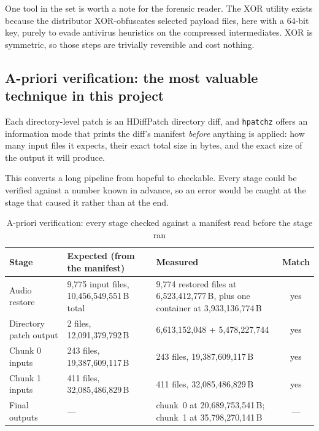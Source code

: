 One tool in the set is worth a note for the forensic reader. The XOR utility
exists because the distributor XOR-obfuscates selected payload files, here with a
64-bit key, purely to evade antivirus heuristics on the compressed intermediates.
XOR is symmetric, so those steps are trivially reversible and cost nothing.

\subsection{A-priori verification: the most valuable technique in this project}

Each directory-level patch is an HDiffPatch directory diff, and \verb|hpatchz|
offers an information mode that prints the diff's manifest \emph{before} anything
is applied: how many input files it expects, their exact total size in bytes, and
the exact size of the output it will produce.

This converts a long pipeline from hopeful to checkable. Every stage could be
verified against a number known in advance, so an error would be caught at the
stage that caused it rather than at the end.

\begin{table}[t]
\caption{A-priori verification: every stage checked against a manifest read before the stage ran}
\label{tab:verify}
\centering
\footnotesize
\begin{tabularx}{\textwidth}{@{}L{3.2cm}L{6.0cm}X c@{}}
\toprule
\textbf{Stage} & \textbf{Expected (from the manifest)} & \textbf{Measured} & \textbf{Match} \\
\midrule
Audio restore &
  9{,}775 input files, 10{,}456{,}549{,}551\,B total &
  9{,}774 restored files at 6{,}523{,}412{,}777\,B, plus one container at
  3{,}933{,}136{,}774\,B & yes \\
Directory patch output &
  2 files, 12{,}091{,}379{,}792\,B &
  6{,}613{,}152{,}048 + 5{,}478{,}227{,}744 & yes \\
Chunk 0 inputs &
  243 files, 19{,}387{,}609{,}117\,B &
  243 files, 19{,}387{,}609{,}117\,B & yes \\
Chunk 1 inputs &
  411 files, 32{,}085{,}486{,}829\,B &
  411 files, 32{,}085{,}486{,}829\,B & yes \\
Final outputs & --- &
  chunk~0 at 20{,}689{,}753{,}541\,B; chunk~1 at 35{,}798{,}270{,}141\,B & --- \\
\bottomrule
\end{tabularx}
\end{table}

